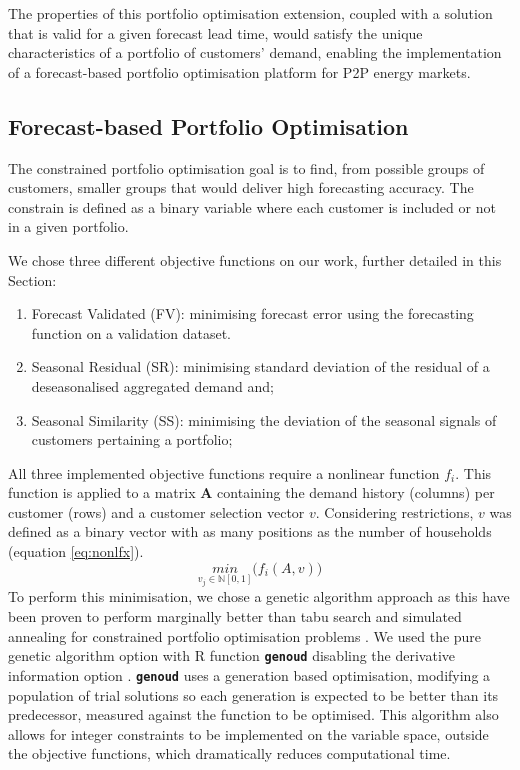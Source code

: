 \documentclass[preprint,3p,12pt,authoryear]{elsarticle}
\begin{document}
The properties of this portfolio optimisation extension, coupled with a solution that is valid for a given forecast lead time, would satisfy the unique characteristics of a portfolio of customers' demand, enabling the implementation of a forecast-based portfolio optimisation platform for P2P energy markets.

\subsection{Forecast-based Portfolio Optimisation}
\label{ss:portopt}

The constrained portfolio optimisation goal is to find, from possible groups of customers, smaller groups that would deliver high forecasting accuracy.
The constrain is defined as a binary variable where each customer is included or not in a given portfolio.

We chose three different objective functions on our work, further detailed in this Section:
\begin{enumerate}
   \item Forecast Validated (FV): minimising forecast error using the forecasting function on a validation dataset.
   \item Seasonal Residual (SR): minimising standard deviation of the residual of a deseasonalised aggregated demand and;
   \item Seasonal Similarity (SS): minimising the deviation of the seasonal signals of customers pertaining a portfolio;
\end{enumerate}
All three implemented objective functions require a nonlinear function $f_i$.
This function is applied to a matrix $\bm{A}$ containing the demand history (columns) per customer (rows) and a customer selection vector $v$.
Considering restrictions, $v$ was defined as a binary vector with as many positions as the number of households (equation \ref{eq:nonlfx}).
\begin{equation}
   \underset{v_j \in \mathbb N[0,1]}{min}\big(f_i(A,v)\big)
   \label{eq:nonlfx}
\end{equation}
To perform this minimisation, we chose a genetic algorithm approach as this have been proven to perform marginally better than tabu search and simulated annealing for constrained portfolio optimisation problems \citep{CHANG20001271}.
We used the pure genetic algorithm option with R function \texttt{\textbf{genoud}} disabling the derivative information option \citep{rgenoud}.
\texttt{\textbf{genoud}} uses a generation based optimisation, modifying a population of trial solutions so each generation is expected to be better than its predecessor, measured against the function to be optimised.
This algorithm also allows for integer constraints to be implemented on the variable space, outside the objective functions, which dramatically reduces computational time.
\end{document}
